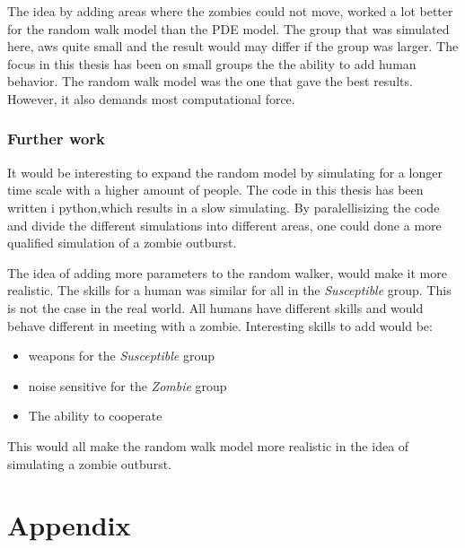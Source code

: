 \documentclass[%
twoside,                 %
final,                   %
chapterprefix=true,      %
open=right               %
10pt]{book}
\begin{document}
\vspace{3mm}




\vspace{3mm}


The idea by adding areas where the zombies could not move, worked a lot better for the random walk model than the PDE model. The group that was simulated here, aws quite small and the result would may differ if the group was larger. The focus in this thesis has been on small groups the the ability to add human behavior. The random walk model was the one that gave the best results. However, it also demands most computational force.

\subsection{Further work}
It would be interesting to expand the random model by simulating for a longer time scale with a higher amount of people. The code in this thesis has been written i python,which results in a slow simulating. By paralellisizing the code and divide the different simulations into different areas, one could done a more qualified simulation of a zombie outburst.


\vspace{3mm}




\vspace{3mm}


The idea of adding more parameters to the random walker, would make it more realistic. The skills for a human was similar for all in the \emph{Susceptible} group. This is not the case in the real world. All humans have different skills and would behave different in meeting with a zombie. Interesting skills to add would be:
\begin{itemize}
\item weapons for the \emph{Susceptible} group

\item noise sensitive for the \emph{Zombie} group

\item The ability to cooperate
\end{itemize}

\noindent
This would all make the random walk model more realistic in the idea of simulating a zombie outburst.



\chapter{Appendix}
\end{document}

